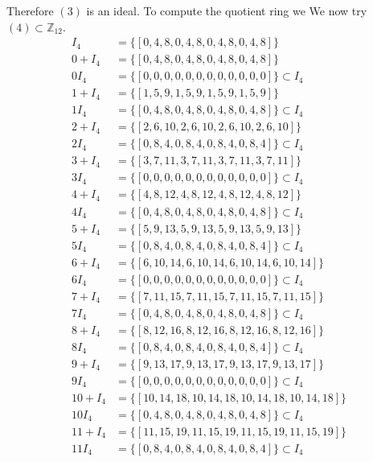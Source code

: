 \documentclass[11pt]{amsart}
\begin{document}
Therefore $(3)$ is an ideal.
To compute the quotient ring we
We now try $(4) \subset \mathbb{Z}_{12}$.
\begin{equation*}
\begin{aligned}
I_4 &= \{[0, 4, 8, 0, 4, 8, 0, 4, 8, 0, 4, 8]\} \\
0+ I_4 &= \{[0, 4, 8, 0, 4, 8, 0, 4, 8, 0, 4, 8]\}\\
0 I_4 &= \{[0, 0, 0, 0, 0, 0, 0, 0, 0, 0, 0, 0]\} \subset I_4 \\
1+ I_4 &= \{[1, 5, 9, 1, 5, 9, 1, 5, 9, 1, 5, 9]\}\\
1 I_4 &= \{[0, 4, 8, 0, 4, 8, 0, 4, 8, 0, 4, 8]\} \subset I_4 \\
2+ I_4 &= \{[2, 6, 10, 2, 6, 10, 2, 6, 10, 2, 6, 10]\}\\
2 I_4 &= \{[0, 8, 4, 0, 8, 4, 0, 8, 4, 0, 8, 4]\} \subset I_4 \\
3+ I_4 &= \{[3, 7, 11, 3, 7, 11, 3, 7, 11, 3, 7, 11]\}\\
3 I_4 &= \{[0, 0, 0, 0, 0, 0, 0, 0, 0, 0, 0, 0]\} \subset I_4 \\
4+ I_4 &= \{[4, 8, 12, 4, 8, 12, 4, 8, 12, 4, 8, 12]\}\\
4 I_4 &= \{[0, 4, 8, 0, 4, 8, 0, 4, 8, 0, 4, 8]\} \subset I_4 \\
5+ I_4 &= \{[5, 9, 13, 5, 9, 13, 5, 9, 13, 5, 9, 13]\}\\
5 I_4 &= \{[0, 8, 4, 0, 8, 4, 0, 8, 4, 0, 8, 4]\} \subset I_4 \\
6+ I_4 &= \{[6, 10, 14, 6, 10, 14, 6, 10, 14, 6, 10, 14]\}\\
6 I_4 &= \{[0, 0, 0, 0, 0, 0, 0, 0, 0, 0, 0, 0]\} \subset I_4 \\
7+ I_4 &= \{[7, 11, 15, 7, 11, 15, 7, 11, 15, 7, 11, 15]\}\\
7 I_4 &= \{[0, 4, 8, 0, 4, 8, 0, 4, 8, 0, 4, 8]\} \subset I_4 \\
8+ I_4 &= \{[8, 12, 16, 8, 12, 16, 8, 12, 16, 8, 12, 16]\}\\
8 I_4 &= \{[0, 8, 4, 0, 8, 4, 0, 8, 4, 0, 8, 4]\} \subset I_4 \\
9+ I_4 &= \{[9, 13, 17, 9, 13, 17, 9, 13, 17, 9, 13, 17]\}\\
9 I_4 &= \{[0, 0, 0, 0, 0, 0, 0, 0, 0, 0, 0, 0]\} \subset I_4 \\
10+ I_4 &= \{[10, 14, 18, 10, 14, 18, 10, 14, 18, 10, 14, 18]\}\\
10 I_4 &= \{[0, 4, 8, 0, 4, 8, 0, 4, 8, 0, 4, 8]\} \subset I_4 \\
11+ I_4 &= \{[11, 15, 19, 11, 15, 19, 11, 15, 19, 11, 15, 19]\}\\
11 I_4 &= \{[0, 8, 4, 0, 8, 4, 0, 8, 4, 0, 8, 4]\} \subset I_4 \\
\end{aligned}
\end{equation*}
\end{document}
